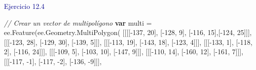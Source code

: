 \documentclass[
  12pt,
  letterpaper,
  twoside]{book}
\newenvironment{Shaded}{\begin{snugshade}}{\end{snugshade}}
\newcommand{\AttributeTok}[1]{\textcolor[rgb]{0.48,0.12,0.64}{#1}}
\newcommand{\CommentTok}[1]{\textcolor[rgb]{0.24,0.58,0.00}{\textit{#1}}}
\newcommand{\ControlFlowTok}[1]{\textcolor[rgb]{0.00,0.00,0.00}{\textbf{#1}}}
\newcommand{\DecValTok}[1]{\textcolor[rgb]{0.28,0.53,0.93}{#1}}
\newcommand{\FunctionTok}[1]{\textcolor[rgb]{0.48,0.12,0.64}{#1}}
\newcommand{\KeywordTok}[1]{\textcolor[rgb]{0.48,0.12,0.64}{#1}}
\newcommand{\NormalTok}[1]{#1}
\newcommand{\OperatorTok}[1]{\textcolor[rgb]{0.00,0.00,0.00}{#1}}
\begin{document}
\textcolor{darkblue}{Ejercicio 12.4}

\begin{Shaded}
\begin{Highlighting}[]
\CommentTok{// Crear un vector de multipolígono}
\ControlFlowTok{var}\NormalTok{ multi }\OperatorTok{=} \KeywordTok{ee}\OperatorTok{.}\FunctionTok{Feature}\NormalTok{(}\KeywordTok{ee}\OperatorTok{.}\AttributeTok{Geometry}\OperatorTok{.}\FunctionTok{MultiPolygon}\NormalTok{(}
\NormalTok{            [[[[}\OperatorTok{{-}}\DecValTok{137}\OperatorTok{,} \DecValTok{20}\NormalTok{]}\OperatorTok{,}\NormalTok{ [}\OperatorTok{{-}}\DecValTok{128}\OperatorTok{,} \DecValTok{9}\NormalTok{]}\OperatorTok{,}\NormalTok{ [}\OperatorTok{{-}}\DecValTok{116}\OperatorTok{,} \DecValTok{15}\NormalTok{]}\OperatorTok{,}\NormalTok{[}\OperatorTok{{-}}\DecValTok{124}\OperatorTok{,} \DecValTok{25}\NormalTok{]]]}\OperatorTok{,}
\NormalTok{             [[[}\OperatorTok{{-}}\DecValTok{123}\OperatorTok{,} \DecValTok{28}\NormalTok{]}\OperatorTok{,}\NormalTok{ [}\OperatorTok{{-}}\DecValTok{129}\OperatorTok{,} \DecValTok{30}\NormalTok{]}\OperatorTok{,}\NormalTok{ [}\OperatorTok{{-}}\DecValTok{139}\OperatorTok{,} \DecValTok{5}\NormalTok{]]]}\OperatorTok{,}
\NormalTok{             [[[}\OperatorTok{{-}}\DecValTok{113}\OperatorTok{,} \DecValTok{19}\NormalTok{]}\OperatorTok{,}\NormalTok{ [}\OperatorTok{{-}}\DecValTok{143}\OperatorTok{,} \DecValTok{18}\NormalTok{]}\OperatorTok{,}\NormalTok{ [}\OperatorTok{{-}}\DecValTok{123}\OperatorTok{,} \DecValTok{4}\NormalTok{]]]}\OperatorTok{,}
\NormalTok{             [[[}\OperatorTok{{-}}\DecValTok{133}\OperatorTok{,} \DecValTok{1}\NormalTok{]}\OperatorTok{,}\NormalTok{ [}\OperatorTok{{-}}\DecValTok{118}\OperatorTok{,} \DecValTok{2}\NormalTok{]}\OperatorTok{,}\NormalTok{ [}\OperatorTok{{-}}\DecValTok{116}\OperatorTok{,} \DecValTok{24}\NormalTok{]]]}\OperatorTok{,}
\NormalTok{             [[[}\OperatorTok{{-}}\DecValTok{109}\OperatorTok{,} \DecValTok{5}\NormalTok{]}\OperatorTok{,}\NormalTok{ [}\OperatorTok{{-}}\DecValTok{103}\OperatorTok{,} \DecValTok{10}\NormalTok{]}\OperatorTok{,}\NormalTok{ [}\OperatorTok{{-}}\DecValTok{147}\OperatorTok{,} \DecValTok{9}\NormalTok{]]]}\OperatorTok{,}
\NormalTok{             [[[}\OperatorTok{{-}}\DecValTok{110}\OperatorTok{,} \DecValTok{14}\NormalTok{]}\OperatorTok{,}\NormalTok{ [}\OperatorTok{{-}}\DecValTok{160}\OperatorTok{,} \DecValTok{12}\NormalTok{]}\OperatorTok{,}\NormalTok{ [}\OperatorTok{{-}}\DecValTok{161}\OperatorTok{,} \DecValTok{7}\NormalTok{]]]}\OperatorTok{,}
\NormalTok{             [[[}\OperatorTok{{-}}\DecValTok{117}\OperatorTok{,} \OperatorTok{{-}}\DecValTok{1}\NormalTok{]}\OperatorTok{,}\NormalTok{ [}\OperatorTok{{-}}\DecValTok{117}\OperatorTok{,} \OperatorTok{{-}}\DecValTok{2}\NormalTok{]}\OperatorTok{,}\NormalTok{ [}\OperatorTok{{-}}\DecValTok{136}\OperatorTok{,} \OperatorTok{{-}}\DecValTok{9}\NormalTok{]]]}\OperatorTok{,}

\end{Highlighting}
\end{Shaded}
\end{document}
